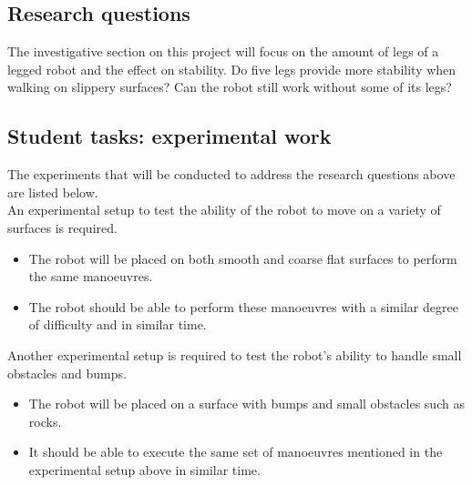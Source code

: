 \vspace{5em}

\subsection{Research questions}
The investigative section on this project will focus on the amount of legs of a legged robot and the effect on stability. Do five legs provide more stability when walking on slippery surfaces? Can the robot still work without some of its legs?

\subsection{Student tasks: experimental work}
The experiments that will be conducted to address the research questions above are listed below.\\

An experimental setup to test the ability of the robot to move on a variety of surfaces is required.
\begin{itemize}
\item The robot will be placed on both smooth and coarse flat surfaces to perform the same manoeuvres.
\item The robot should be able to perform these manoeuvres with a similar degree of difficulty and in similar time.
\end{itemize}
Another experimental setup is required to test the robot's ability to handle small obstacles and bumps.
\begin{itemize}
\item The robot will be placed on a surface with bumps and small obstacles such as rocks.
\item It should be able to execute the same set of manoeuvres mentioned in the experimental setup above in similar time.
\end{itemize}
\newpage 



